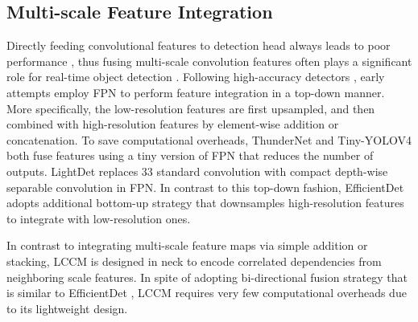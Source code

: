 \documentclass[lettersize,journal]{IEEEtran}
\begin{document}
\subsection{Multi-scale Feature Integration}

Directly feeding convolutional features to detection head always leads to poor performance \cite{Pelee,howard2017mobilenets,sandler2018mobilenetv2}, thus fusing multi-scale convolution features often plays a significant role for real-time object detection \cite{li2018tiny,redmon2017yolo9000,redmon2018yolov3}. Following high-accuracy detectors \cite{lin2017feature,liu2018path}, early attempts \cite{li2018tiny,qin2019thundernet,tang2020lightdet} employ FPN to perform feature integration in a top-down manner. More specifically, the low-resolution features are first upsampled, and then combined with high-resolution features by element-wise addition or concatenation. To save computational overheads, ThunderNet \cite{qin2019thundernet} and Tiny-YOLOV4 \cite{wang2021scaled} both fuse features using a tiny version of FPN that reduces the number of outputs. LightDet \cite{tang2020lightdet} replaces 33 standard convolution with compact depth-wise separable convolution in FPN. In contrast to this top-down fashion, EfficientDet \cite{tan2020efficientdet} adopts additional bottom-up strategy that downsamples high-resolution features to integrate with low-resolution ones. 





In contrast to integrating multi-scale feature maps via simple addition or stacking, LCCM is designed in neck to encode correlated dependencies from neighboring scale features. In spite of adopting bi-directional fusion strategy that is similar to EfficientDet \cite{tan2020efficientdet}, LCCM requires very few computational overheads due to its lightweight design. 
\end{document}
